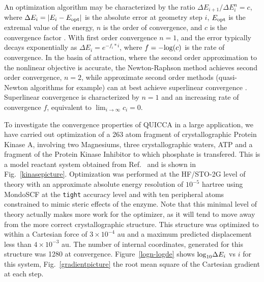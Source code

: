 \documentclass[prl,twocolumn,showpacs,twocolumngrid,superbib]{revtex4}
\begin{document}
An optimization algorithm may be characterized by the ratio ${\Delta E_{i+1}}/{\Delta E_{i}^n} =c$,
where $\Delta E_i = |E_{i}-E_{\rm opt}| $ is the absolute error at geometry step $i$,
$E_{\rm opt}$ is the extremal value of the energy, $n$ is the order of convergence, 
and $c$ is the convergence factor \cite{Quarteroni}.  With first order convergence $n=1$, and
the error typically decays exponentially as $\Delta E_i = e^{-f_i*i}$, where $f=-{\rm log}(c)$ is the 
rate of convergence. In the basin of attraction, where the second order approximation 
to the nonlinear objective is accurate, the Newton-Raphson method achieves second order convergence,
$ n=2$, while approximate second order methods (quasi-Newton algorithms for example) can 
at best achieve superlinear convergence \cite{RFletcher,Pulay_natural_internals}.   Superlinear 
convergence is characterized by $n=1$ and an increasing rate of convergence $f$, equivalent to 
$\lim_{i \to \infty} c_i = 0$.  

To investigate the convergence properties of QUICCA in a large application, we have carried out
optimization of a 263 atom fragment of crystallographic Protein Kinase A, involving two Magnesiums,
three crystallographic waters, ATP and a fragment of the Protein Kinase Inhibitor to which phosphate 
is transfered. This is a model reactant system obtained from Ref.~ and is shown in 
Fig.~\ref{kinasepicture}.  Optimization was performed at the HF/STO-2G level of theory with an 
approximate absolute energy resolution of $10^{-5}$ hartree using MondoSCF \cite{MondoSCF} at the 
{\tt tight} accuracy level and with ten peripheral atoms  constrained to mimic steric effects of the enzyme.  
Note that this minimal level of theory actually makes more work for the optimizer, as it will tend to 
move away from the more correct crystallographic structure.   This structure was optimized to within a 
Cartesian force of $3\times10^{-4}$ au and a maximum predicted displacement less than $4\times10^{-3}$ au.
The number of internal coordinates, generated for this structure was 1280 at convergence.  Figure~\ref{logn-logde} 
shows ${\rm log}_{10} \Delta E_i$ vs $i$ for this system, Fig.~\ref{gradientpicture} the root mean square 
of the Cartesian gradient at each step.
\end{document}
